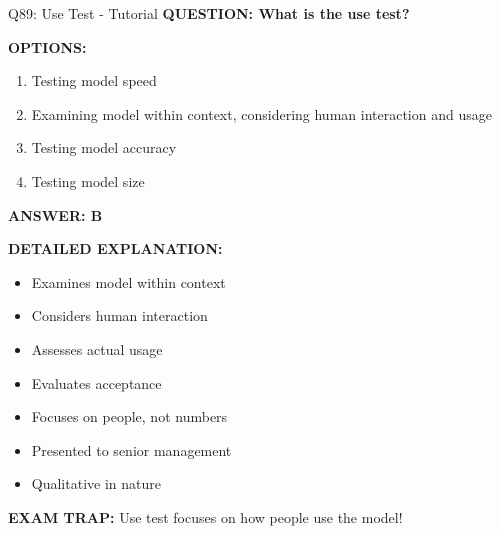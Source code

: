 \documentclass[8pt]{beamer}
\begin{document}
	\begin{frame}{Q89: Use Test - Tutorial}
		\fontsize{6.5}{7.5}\selectfont
		\textbf{QUESTION: What is the use test?}
		
		\vspace{0.1cm}
		\textbf{OPTIONS:}
		\begin{enumerate}
			\item Testing model speed
			\item Examining model within context, considering human interaction and usage
			\item Testing model accuracy
			\item Testing model size
		\end{enumerate}
		
		\vspace{0.1cm}
		\textcolor{myblue}{\textbf{ANSWER: B}}
		
		\vspace{0.1cm}
		\textbf{DETAILED EXPLANATION:}
		\begin{itemize}
			\item Examines model within context
			\item Considers human interaction
			\item Assesses actual usage
			\item Evaluates acceptance
			\item Focuses on people, not numbers
			\item Presented to senior management
			\item Qualitative in nature
		\end{itemize}
		
		\vspace{0.1cm}
		\textcolor{myred}{\textbf{EXAM TRAP:}} Use test focuses on \textcolor{myblue}{how people use the model}!
	\end{frame}
	
\end{document}
